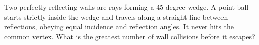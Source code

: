 Two perfectly reflecting walls are rays forming a 45-degree wedge. A point ball starts strictly inside the wedge and travels along a straight line between reflections, obeying equal incidence and reflection angles. It never hits the common vertex. What is the greatest number of wall collisions before it escapes?
